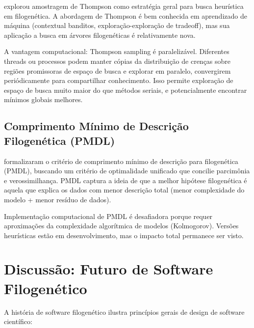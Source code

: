 \textcite{wheeler2024} explorou amostragem de Thompson como estratégia geral para busca heurística em filogenética. A abordagem de Thompson é bem conhecida em aprendizado de máquina (contextual banditos, exploração-exploração de tradeoff), mas sua aplicação a busca em árvores filogenéticas é relativamente nova.

A vantagem computacional: Thompson sampling é paralelizável. Diferentes threads ou processos podem manter cópias da distribuição de crenças sobre regiões promissoras de espaço de busca e explorar em paralelo, convergirem periódicamente para compartilhar conhecimento. Isso permite exploração de espaço de busca muito maior do que métodos seriais, e potencialmente encontrar mínimos globais melhores.

\subsection{Comprimento Mínimo de Descrição Filogenética (PMDL)}

\textcite{wheeler2025} formalizaram o critério de comprimento mínimo de descrição para filogenética (PMDL), buscando um critério de optimalidade unificado que concilie parcimônia e verossimilhança. PMDL captura a ideia de que a melhor hipótese filogenética é aquela que explica os dados com menor descrição total (menor complexidade do modelo + menor resíduo de dados).

Implementação computacional de PMDL é desafiadora porque requer aproximações da complexidade algorítmica de modelos (Kolmogorov). Versões heurísticas estão em desenvolvimento, mas o impacto total permanece ser visto.

\section{Discussão: Futuro de Software Filogenético}

A história de software filogenético ilustra princípios gerais de design de software científico:

